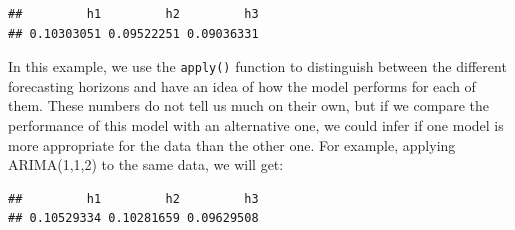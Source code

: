 \documentclass[
]{book}
\newenvironment{Shaded}{\begin{snugshade}}{\end{snugshade}}
\newcommand{\AttributeTok}[1]{\textcolor[rgb]{0.77,0.63,0.00}{#1}}
\newcommand{\ConstantTok}[1]{\textcolor[rgb]{0.00,0.00,0.00}{#1}}
\newcommand{\DecValTok}[1]{\textcolor[rgb]{0.00,0.00,0.81}{#1}}
\newcommand{\FunctionTok}[1]{\textcolor[rgb]{0.00,0.00,0.00}{#1}}
\newcommand{\NormalTok}[1]{#1}
\newcommand{\OtherTok}[1]{\textcolor[rgb]{0.56,0.35,0.01}{#1}}
\newcommand{\SpecialCharTok}[1]{\textcolor[rgb]{0.00,0.00,0.00}{#1}}
\newcommand{\StringTok}[1]{\textcolor[rgb]{0.31,0.60,0.02}{#1}}
\theoremstyle{definition}
\theoremstyle{definition}
\theoremstyle{definition}
\theoremstyle{definition}
\theoremstyle{remark}
\begin{document}
\begin{Shaded}
\end{Shaded}

\begin{verbatim}
##         h1         h2         h3 
## 0.10303051 0.09522251 0.09036331
\end{verbatim}

In this example, we use the \texttt{apply()} function to distinguish between the different forecasting horizons and have an idea of how the model performs for each of them. These numbers do not tell us much on their own, but if we compare the performance of this model with an alternative one, we could infer if one model is more appropriate for the data than the other one. For example, applying ARIMA(1,1,2) to the same data, we will get:

\begin{Shaded}
\end{Shaded}

\begin{verbatim}
##         h1         h2         h3 
## 0.10529334 0.10281659 0.09629508
\end{verbatim}
\end{document}
